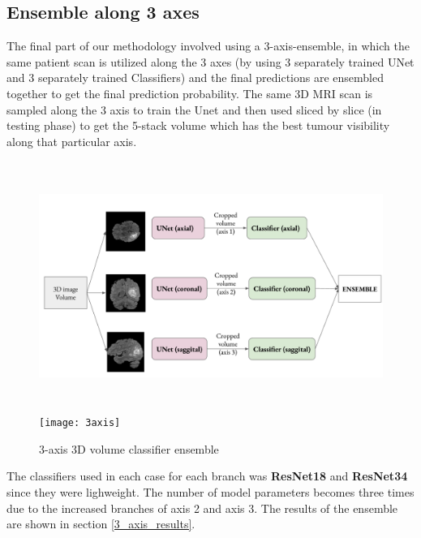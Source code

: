 \subsection{Ensemble along 3 axes}\label{3-axis-ensemble}
\vspace*{4mm}

The final part of our methodology involved using a 3-axis-ensemble, in which the same patient scan is utilized along the 3 axes (by using 3 separately trained UNet and 3 separately trained Classifiers) and the final predictions are ensembled together to get the final prediction probability. The same 3D MRI scan is sampled along the 3 axis to train the Unet and then used sliced by slice (in testing phase) to get the 5-stack volume which has the best tumour visibility along that particular axis.
\vspace*{4mm}
\begin{figure}[H]
  \begin{center}
    \leavevmode
    \ifpdf
      \includegraphics[height=3.2in]{Methodology/Chapter3Figs/3_axis_ensemble.png}
    \else
      \texttt{[image: 3axis]}
    \fi
    \caption{3-axis 3D volume classifier ensemble}
    \label{3axis}
  \end{center}
\end{figure}

The classifiers used in each case for each branch was \textbf{ResNet18} and \textbf{ResNet34} since they were lighweight. The number of model parameters becomes three times due to the increased branches of axis 2 and axis 3. The results of the ensemble are shown in section \ref{3_axis_results}.
















